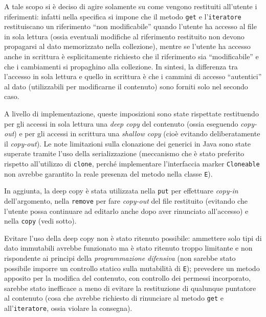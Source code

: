 \documentclass[a4paper,10pt]{article}
\begin{document}
 A tale scopo si è deciso di agire solamente su come vengono restituiti all'utente i riferimenti: infatti nella specifica si impone che il metodo \texttt{get} e l'\texttt{iteratore} restituiscano un riferimento ``non modificabile'' quando l'utente ha accesso al file in sola lettura (ossia eventuali modifiche al riferimento restituito non devono propagarsi al dato memorizzato nella collezione), mentre se l'utente ha accesso anche in scrittura è esplicitamente richiesto che il riferimento sia ``modificabile'' e che i cambiamenti si propaghino alla collezione. In sintesi, la differenza tra l'accesso in sola lettura e quello in scrittura è che i cammini di accesso ``autentici'' al dato (utilizzabili per modificarne il contenuto) sono forniti solo nel secondo caso.
 
 A livello di implementazione, queste imposizioni sono state rispettate restituendo per gli accessi in sola lettura una \textit{deep copy} del contenuto (ossia eseguendo \textit{copy-out}) e per gli accessi in scrittura una \textit{shallow copy} (cioè evitando deliberatamente il \textit{copy-out}). Le note limitazioni sulla clonazione dei generici in Java sono state superate tramite l'uso della serializzazione (meccanismo che è stato preferito rispetto all'utilizzo di \texttt{clone}, perché implementare l'interfaccia marker \texttt{Cloneable} non avrebbe garantito la reale presenza del metodo nella classe \texttt{E}).
 
\begin{small}
In aggiunta, la deep copy è stata utilizzata nella \texttt{put} per effettuare \textit{copy-in} dell'argomento, nella \texttt{remove} per fare \textit{copy-out} del file restituito (evitando che l'utente possa continuare ad editarlo anche dopo aver rinunciato all'accesso) e nella \texttt{copy} (vedi sotto).
\end{small}

 Evitare l'uso della deep copy non è stato ritenuto possibile: ammettere solo tipi di dato immutabili avrebbe funzionato ma è stato ritenuto troppo limitante e non rispondente ai principi della \textit{programmazione difensiva} (non sarebbe stato possibile imporre un controllo statico sulla mutabilità di \texttt{E}); prevedere un metodo apposito per la modifica del contenuto, con controllo dei permessi incorporato, sarebbe stato inefficace a meno di evitare la restituzione di qualunque puntatore al contenuto (cosa che avrebbe richiesto di rinunciare al metodo \texttt{get} e all'\texttt{iteratore}, ossia violare la consegna).
 
\end{document}
